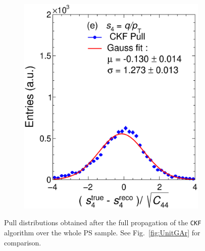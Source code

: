 \begin{figure}[t]
\begin{subfigure}{0.32\textwidth}
         \includegraphics[width=\textwidth]{figures/ch5-KF_NDGAr/FullSample/Int/Units/IdealUnit4.eps}
         \caption{}
         \label{fig:resp4KFGAr_IntI}
     \end{subfigure}
        \caption{Pull distributions obtained after the full propagation of the \texttt{CKF} algorithm over the whole PS sample. See Fig.~\ref{fig:UnitGAr} for comparison.}
        \label{fig:UnitGArKF_IntI}
\end{figure}

